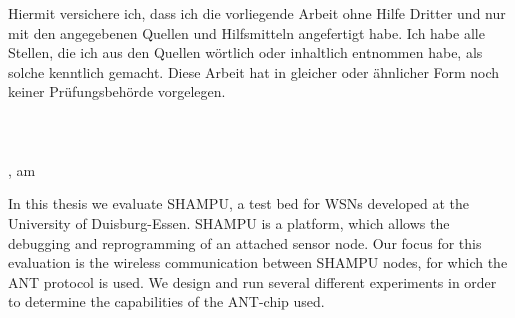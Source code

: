 Hiermit versichere ich, dass ich die vorliegende Arbeit ohne Hilfe Dritter und nur mit den angegebenen Quellen und
Hilfsmitteln angefertigt habe. Ich habe alle Stellen, die ich aus den Quellen wörtlich oder inhaltlich entnommen habe,
als solche kenntlich gemacht. Diese Arbeit hat in gleicher oder ähnlicher Form noch keiner Prüfungsbehörde vorgelegen.\\
\\
\\
\\
\ort, am \datum

In this thesis we evaluate SHAMPU, a test bed for WSNs developed at the University of Duisburg-Essen. 
SHAMPU is a platform, which allows the debugging and reprogramming of an attached sensor node.
Our focus for this evaluation is the wireless communication between SHAMPU nodes, for which the ANT protocol is used. 
We design and run several different experiments in order to determine the capabilities of the ANT-chip used.
